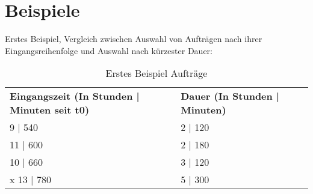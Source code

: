 \documentclass[a4paper,10pt,ngerman]{scrartcl}
\begin{document}
\section{Beispiele}\label{sec:beispiele}
Erstes Beispiel, Vergleich zwischen Auswahl von Aufträgen nach ihrer Eingangsreihenfolge
und Auswahl nach kürzester Dauer: 
 \begin{table}[htb]
    \centering
    \begin{tabular}{lll}
    \textbf{Eingangszeit (In Stunden | Minuten seit t0)} & \textbf{Dauer (In Stunden | Minuten)} \\
    9 | 540 & 2 | 120 \\
    11 | 600 & 2 | 180 \\
    10 | 660 & 3 | 120 \\
x    13 | 780 & 5 | 300 \\
    \end{tabular}
    \caption{Erstes Beispiel Aufträge}
    \label{tab:Table1}
 \end{table}
\end{document}
